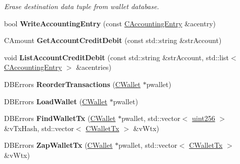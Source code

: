 \begin{DoxyCompactItemize}
\begin{DoxyCompactList}\small\item\em Erase destination data tuple from wallet database. \end{DoxyCompactList}\item 
\mbox{\label{class_c_wallet_d_b_a958a0138b171e213be35f48933adcb89}} 
bool {\bfseries Write\+Accounting\+Entry} (const \mbox{\hyperlink{class_c_accounting_entry}{C\+Accounting\+Entry}} \&acentry)
\item 
\mbox{\label{class_c_wallet_d_b_af924f6275a873e048699e6ef0bf66346}} 
C\+Amount {\bfseries Get\+Account\+Credit\+Debit} (const std\+::string \&str\+Account)
\item 
\mbox{\label{class_c_wallet_d_b_a51555c82291fe16081880110541e207f}} 
void {\bfseries List\+Account\+Credit\+Debit} (const std\+::string \&str\+Account, std\+::list$<$ \mbox{\hyperlink{class_c_accounting_entry}{C\+Accounting\+Entry}} $>$ \&acentries)
\item 
\mbox{\label{class_c_wallet_d_b_ac195547d64e4c0e84be73e245e7d49c8}} 
D\+B\+Errors {\bfseries Reorder\+Transactions} (\mbox{\hyperlink{class_c_wallet}{C\+Wallet}} $\ast$pwallet)
\item 
\mbox{\label{class_c_wallet_d_b_a14f26e53502d1a60dd2b034f830acf03}} 
D\+B\+Errors {\bfseries Load\+Wallet} (\mbox{\hyperlink{class_c_wallet}{C\+Wallet}} $\ast$pwallet)
\item 
\mbox{\label{class_c_wallet_d_b_a7994078fff8bd8b1cc85b2bf0f3ccff3}} 
D\+B\+Errors {\bfseries Find\+Wallet\+Tx} (\mbox{\hyperlink{class_c_wallet}{C\+Wallet}} $\ast$pwallet, std\+::vector$<$ \mbox{\hyperlink{classuint256}{uint256}} $>$ \&v\+Tx\+Hash, std\+::vector$<$ \mbox{\hyperlink{class_c_wallet_tx}{C\+Wallet\+Tx}} $>$ \&v\+Wtx)
\item 
\mbox{\label{class_c_wallet_d_b_a3d6458600538f741a0b05b9788036b56}} 
D\+B\+Errors {\bfseries Zap\+Wallet\+Tx} (\mbox{\hyperlink{class_c_wallet}{C\+Wallet}} $\ast$pwallet, std\+::vector$<$ \mbox{\hyperlink{class_c_wallet_tx}{C\+Wallet\+Tx}} $>$ \&v\+Wtx)
\item 

\end{DoxyCompactItemize}
